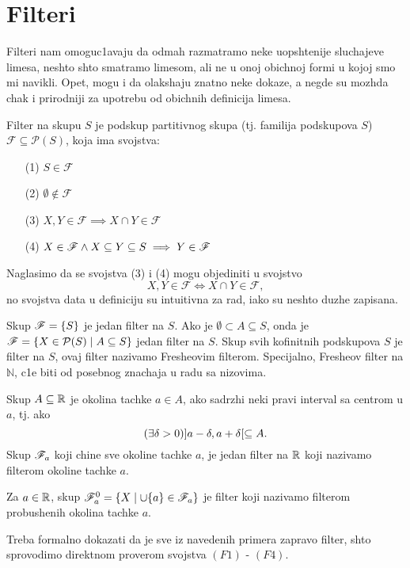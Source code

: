 \documentclass[../maing.tex]{subfiles}
\begin{document}
\section{Filteri}

    Filteri nam omoguc1avaju da odmah razmatramo neke uopshtenije sluchajeve limesa, neshto shto smatramo limesom, ali ne u onoj obichnoj formi u kojoj smo mi navikli. Opet, mogu i da olakshaju znatno neke dokaze, a negde su mozhda chak i prirodniji za upotrebu od obichnih definicija limesa.

    {\de Filter na skupu $S$ je podskup partitivnog skupa (tj. familija podskupova $S$) $\mathscr{F}\subseteq\mathcal{P}(S)$, koja ima svojstva:
    \begin{itemize}
        \item[({\latin{F}}1)] $S \in \mathscr{F}$  
        \item[({\latin{F}}2)] $\emptyset \notin \mathscr{F}$
        \item[({\latin{F}}3)] $X,Y \in \mathscr{F} \implies X\cap Y \in \mathscr{F}$
        \item[({\latin{F}}4)] $X \in \mathscr{F} \land X \subseteq Y\subseteq S\implies Y \in \mathscr{F}$
    \end{itemize}
    }

\nap Naglasimo da se svojstva ({3}) i ({4}) mogu objediniti u svojstvo $$X,Y \in \mathscr{F} \iff X\cap Y \in \mathscr{F},$$ no svojstva data u definiciju su intuitivna za rad, iako su neshto duzhe zapisana.

    {\pr Skup $\mathscr{F}=\{S\}$ je jedan filter na $S$.}
    {\pr Ako je $\emptyset \subset A\subseteq S$, onda je $\mathscr{F}=\{X\in \mathcal{P}(S)\mid A\subseteq S\}$ jedan filter na $S$.}
    {\pr Skup svih kofinitnih podskupova $S$ je filter na $S$, ovaj filter nazivamo Fresheovim filterom. Specijalno, Fresheov filter na $\mathbb{N}$, c1e biti od posebnog znachaja u radu sa nizovima.}

   {\pr Skup $A\subseteq \mathbb{R}$ je okolina tachke $a \in A$, ako sadrzhi neki pravi interval sa centrom u $a$, tj. ako $$(\exists \delta > 0) ]a-\delta,a+\delta[ \subseteq A.$$ Skup $\mathscr{F}_a$ koji chine sve okoline tachke $a$, je jedan filter na $\mathbb{R}$ koji nazivamo filterom okoline tachke $a$.}

   {\pr Za $a \in \mathbb{R}$, skup $\mathscr{F}_a^0=\{X\mid\cup \{a\}\in \mathscr{F}_a\}$ je filter koji nazivamo filterom probushenih okolina tachke $a$.}

   \nap Treba formalno dokazati da je sve iz navedenih primera zapravo filter, shto sprovodimo direktnom proverom svojstva $(F1)$ - $(F4)$.
\end{document}
